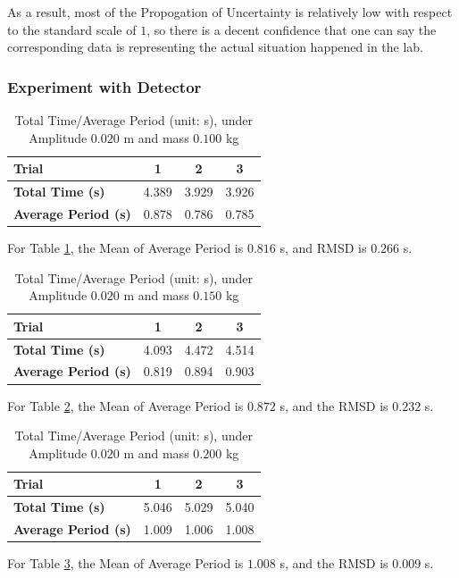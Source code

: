 \documentclass{article}
\begin{document}
As a result, most of the Propogation of Uncertainty is relatively low with respect to the standard scale of $1$, so there is a decent confidence that one can say the corresponding data is representing the actual situation happened in the lab.

\newpage

\subsubsection{Experiment with Detector}
\begin{table}[h!]
\centering
\caption{Total Time/Average Period (unit: s), under Amplitude $0.020$ m and mass $0.100$ kg}
\begin{tabular}{l||c|c|c}
\toprule
\textbf{Trial} & 1 & 2 & 3 \\ 
\midrule
\midrule
\textbf{Total Time (s)} & 4.389 & 3.929 & 3.926 \\
\hline 
\textbf{Average Period (s)} & 0.878 & 0.786 & 0.785 \\ 
\bottomrule
\end{tabular}
\label{tab:data_dyn_detect_1}
\end{table}
For Table \ref{tab:data_dyn_detect_1}, the Mean of Average Period is $0.816$ s, and RMSD is $0.266$ s.

\hfill

\begin{table}[h!]
\centering
\caption{Total Time/Average Period (unit: s), under Amplitude $0.020$ m and mass $0.150$ kg}
\begin{tabular}{l||c|c|c}
\toprule
\textbf{Trial} & 1 & 2 & 3 \\ 
\midrule
\midrule
\textbf{Total Time (s)} & 4.093 & 4.472 & 4.514 \\ 
\hline
\textbf{Average Period (s)} & 0.819 & 0.894 & 0.903 \\ 
\bottomrule
\end{tabular}
\label{tab:data_dyn_detect_2}
\end{table}
For Table \ref{tab:data_dyn_detect_2}, the Mean of Average Period is $0.872$ s, and the RMSD is $0.232$ s.


\hfill

\begin{table}[h!]
\centering
\caption{Total Time/Average Period (unit: s), under Amplitude $0.020$ m and mass $0.200$ kg}
\begin{tabular}{l||c|c|c}
\toprule
\textbf{Trial} & 1 & 2 & 3 \\ 
\midrule
\midrule
\textbf{Total Time (s)} & 5.046 & 5.029 & 5.040 \\ 
\hline
\textbf{Average Period (s)} & 1.009 & 1.006 & 1.008 \\ 
\bottomrule
\end{tabular}
\label{tab:data_dyn_detect_3}
\end{table}
For Table \ref{tab:data_dyn_detect_3}, the Mean of Average Period is $1.008$ s, and the RMSD is $0.009$ s.
\end{document}

